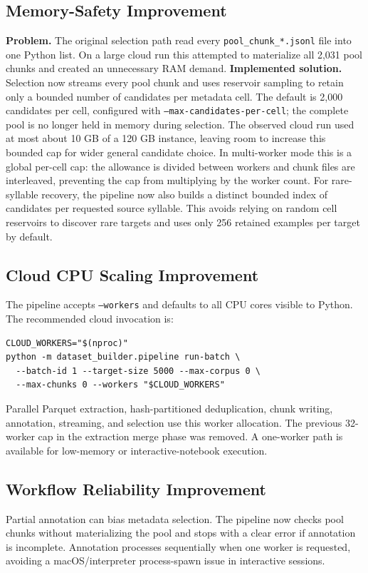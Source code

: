 \documentclass[11pt,a4paper]{article}
\begin{document}
\subsection{Memory-Safety Improvement}
\textbf{Problem.} The original selection path read every \texttt{pool\_chunk\_*.jsonl} file into one Python list.
On a large cloud run this attempted to materialize all 2,031 pool chunks and created an unnecessary RAM demand.
\textbf{Implemented solution.} Selection now streams every pool chunk and uses reservoir sampling to retain only a bounded number of candidates per metadata cell.
The default is 2,000 candidates per cell, configured with \texttt{--max-candidates-per-cell}; the complete pool is no longer held in memory during selection. The observed cloud run used at most about 10 GB of a 120 GB instance, leaving room to increase this bounded cap for wider general candidate choice.
In multi-worker mode this is a global per-cell cap: the allowance is divided between workers and chunk files are interleaved, preventing the cap from multiplying by the worker count.
For rare-syllable recovery, the pipeline now also builds a distinct bounded index of candidates per requested source syllable. This avoids relying on random cell reservoirs to discover rare targets and uses only 256 retained examples per target by default.
\subsection{Cloud CPU Scaling Improvement}
The pipeline accepts \texttt{--workers} and defaults to all CPU cores visible to Python.
The recommended cloud invocation is:
\begin{verbatim}
CLOUD_WORKERS="$(nproc)"
python -m dataset_builder.pipeline run-batch \
  --batch-id 1 --target-size 5000 --max-corpus 0 \
  --max-chunks 0 --workers "$CLOUD_WORKERS"
\end{verbatim}
Parallel Parquet extraction, hash-partitioned deduplication, chunk writing, annotation, streaming, and selection use this worker allocation.
The previous 32-worker cap in the extraction merge phase was removed. A one-worker path is available for low-memory or interactive-notebook execution.
\subsection{Workflow Reliability Improvement}
Partial annotation can bias metadata selection. The pipeline now checks pool chunks without materializing the pool and stops with a clear error if annotation is incomplete.
Annotation processes sequentially when one worker is requested, avoiding a macOS/interpreter process-spawn issue in interactive sessions.
\end{document}
